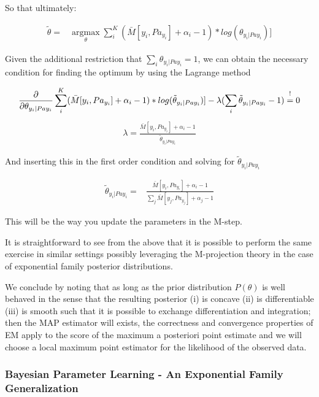 \documentclass[11pt]{article}
\begin{document}
\begin{article}
So that ultimately:

\begin{align} \label{eq:solution2}
\tilde{\theta} =& \operatorname*{argmax}_{\theta} \sum_i^K (\bar{M}[y_i, Pa_{y_i}] + \alpha_i - 1) * log(\theta_{y_i | Pa{y_i}})] 
\end{align}

Given the additional restriction that \(\sum_i \theta_{y_i |
    Pa{y_i}} = 1\), we can obtain the necessary condition for finding
the optimum by using the Lagrange method

\begin{align} \label{eq:first-order1}
\frac{\partial}{\partial \theta_{y_i | Pa{y_i}}} \sum_i^K (\bar{M}[y_i, Pa_{y_i}] + \alpha_i - 1) * log(\tilde{\theta}_{y_i | Pa{y_i}})] - \lambda (\sum_i \tilde{\theta}_{y_i | Pa{y_i}} - 1) \mathrel{\stackon[5pt]{$=$}{$\scriptstyle!$}} 0
\end{align}
\begin{align} \label{eq:first-order2}
\lambda = \frac{\bar{M}[y_i, Pa_{y_i}] + \alpha_i - 1}{\tilde{\theta}_{y_i | Pa{y_i}}}
\end{align}

And inserting this in the first order condition and solving for
\(\tilde{\theta}_{y_i | Pa{y_i}}\)

\begin{align} \label{eq:solution}
\tilde{\theta}_{y_i | Pa{y_i}} =& \frac{\bar{M}[y_i, Pa_{y_i}] + \alpha_i - 1}{\sum_j \bar{M}[y_j, Pa_{y_j}] + \alpha_j - 1}
\end{align}

This will be the way you update the parameters in the M-step.

It is straightforward to see from the above that it is possible to
perform the same exercise in similar settings possibly leveraging
the M-projection theory in the case of exponential family posterior
distributions. 

We conclude by noting that as long as the prior distribution
\(P(\theta)\) is well behaved in the sense that the resulting
posterior (i) is concave (ii) is differentiable (iii) is smooth
such that it is possible to exchange differentiation and
integration; then the MAP estimator will exists, the correctness
and convergence properties of EM apply to the score of the maximum
a posteriori point estimate and we will choose a local maximum
point estimator for the likelihood of the observed data.

\subsubsection{Bayesian Parameter Learning - An Exponential Family Generalization}
\label{sec:orgf0a8d89}


\end{article}
\end{document}

